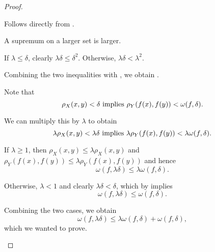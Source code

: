 \begin{proof}\mbox{}
  \begin{description}
     Follows directly from .

     A supremum on a larger set is larger.

     If \( \lambda \leq \delta \), clearly \( \lambda \delta \leq \delta^2 \). Otherwise, \( \lambda \delta < \lambda^2 \).

    Combining the two inequalities with , we obtain .

     Note that
    \begin{equation*}
      \rho_X(x, y) < \delta \text{ implies } \rho_Y(f(x), f(y)) < \omega(f, \delta).
    \end{equation*}

    We can multiply this by \( \lambda \) to obtain
    \begin{equation*}
      \lambda \rho_X(x, y) < \lambda \delta \text{ implies } \lambda \rho_Y(f(x), f(y)) < \lambda \omega(f, \delta).
    \end{equation*}

    If \( \lambda \geq 1 \), then \( \rho_X(x, y) \leq \lambda \rho_X(x, y) \) and \( \rho_Y(f(x), f(y)) \leq \lambda \rho_Y(f(x), f(y)) \) and hence
    \begin{equation*}
      \omega(f, \lambda \delta) \leq \lambda \omega(f, \delta).
    \end{equation*}

    Otherwise, \( \lambda < 1 \) and clearly \( \lambda \delta < \delta \), which by  implies
    \begin{equation*}
      \omega(f, \lambda \delta) \leq \omega(f, \delta).
    \end{equation*}

    Combining the two cases, we obtain
    \begin{equation*}
      \omega(f, \lambda \delta) \leq \lambda \omega(f, \delta) + \omega(f, \delta),
    \end{equation*}
    which we wanted to prove.
  \end{description}
\end{proof}

